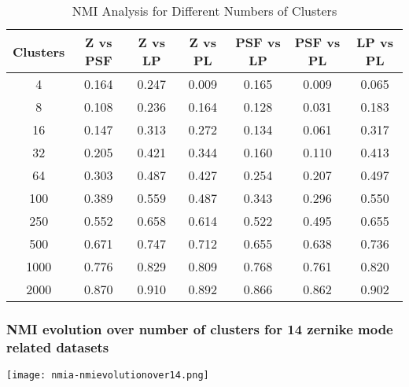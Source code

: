 \begin{table}[h!]
\centering
\begin{tabular}{|c|c|c|c|c|c|c|}
\hline
\textbf{Clusters} & \textbf{Z vs PSF} & \textbf{Z vs LP} & \textbf{Z vs PL} & \textbf{PSF vs LP} & \textbf{PSF vs PL} & \textbf{LP vs PL} \\
\hline
4 & 0.164 & 0.247 & 0.009 & 0.165 & 0.009 & 0.065 \\
8 & 0.108 & 0.236 & 0.164 & 0.128 & 0.031 & 0.183 \\
16 & 0.147 & 0.313 & 0.272 & 0.134 & 0.061 & 0.317 \\
32 & 0.205 & 0.421 & 0.344 & 0.160 & 0.110 & 0.413 \\
64 & 0.303 & 0.487 & 0.427 & 0.254 & 0.207 & 0.497 \\
100 & 0.389 & 0.559 & 0.487 & 0.343 & 0.296 & 0.550 \\
250 & 0.552 & 0.658 & 0.614 & 0.522 & 0.495 & 0.655 \\
500 & 0.671 & 0.747 & 0.712 & 0.655 & 0.638 & 0.736 \\
1000 & 0.776 & 0.829 & 0.809 & 0.768 & 0.761 & 0.820 \\
2000 & 0.870 & 0.910 & 0.892 & 0.866 & 0.862 & 0.902 \\
\hline
\end{tabular}
\caption{NMI Analysis for Different Numbers of Clusters}
\end{table}

		\FloatBarrier
		
	\subsubsection{NMI evolution over number of clusters for 14 zernike mode related datasets}
		\begin{figure*}[ht!]
			\centering
			\texttt{[image: nmia-nmievolutionover14.png]}
		\end{figure*}
		
